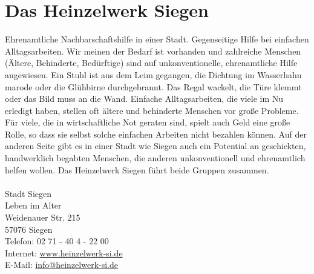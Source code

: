 \section{Das Heinzelwerk Siegen}
Ehrenamtliche Nachbarschaftshilfe in einer Stadt. Gegenseitige Hilfe bei einfachen Alltagsarbeiten. Wir meinen der Bedarf ist vorhanden und zahlreiche Menschen (Ältere, Behinderte, Bedürftige) sind auf unkonventionelle, ehrenamtliche Hilfe angewiesen.  
Ein Stuhl ist aus dem Leim gegangen, die Dichtung im Wasserhahn marode oder die Glühbirne durchgebrannt. Das Regal wackelt, die 
Türe klemmt oder das Bild muss an die Wand.  Einfache Alltagsarbeiten, die viele im Nu erledigt haben, stellen oft ältere und behinderte Menschen vor große Probleme. Für viele, die in wirtschaftliche Not geraten sind, spielt auch Geld eine große Rolle, so dass sie selbst solche einfachen Arbeiten nicht bezahlen können.  Auf der anderen Seite gibt es in einer Stadt wie Siegen auch ein 
Potential an geschickten, handwerklich begabten Menschen, die anderen unkonventionell und ehrenamtlich helfen wollen. 
Das Heinzelwerk Siegen führt beide Gruppen zusammen.\\
\\
Stadt Siegen\\
Leben im Alter\\
Weidenauer Str. 215\\
57076 Siegen \\
Telefon: 02 71 - 40 4 - 22 00 \\
Internet: \href{http://www.heinzelwerk-si.de}{www.heinzelwerk-si.de} \\
E-Mail: \href{mailto:info@heinzelwerk-si.de}{info@heinzelwerk-si.de} 